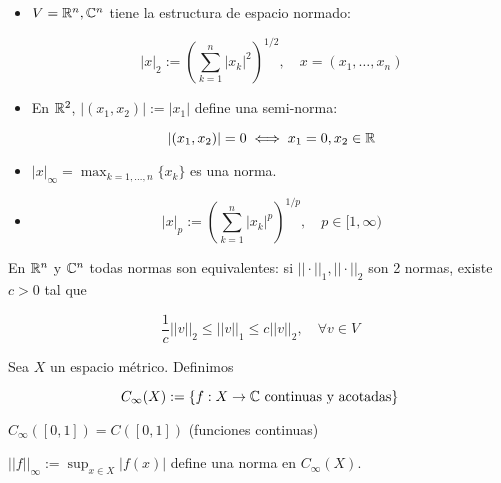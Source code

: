 \begin{fexample}
    \begin{itemize}
        \item $V=\mathbb{R}^n,\mathbb{C}^n$ tiene la estructura de espacio normado:

    \[|x|_2:=\left(\sum_{k=1}^n |x_k|^2\right)^{1/2},\quad x=(x_1,\ldots,x_n)\]

    \item En $\mathbb{R}^2$, $|(x_1,x_2)|:=|x_1|$ define una semi-norma:


    \[|(x_1,x_2)|=0\iff x_1=0,x_2\in\mathbb{R}\]

    \item $|x|_\infty=\displaystyle\max_{k=1,\ldots,n}\{x_k\}$ es una norma.

    \item \[|x|_p:=\left(\sum_{k=1}^n |x_k|^p\right)^{1/p},\quad p\in [1,\infty)\]
    \end{itemize}



\end{fexample}

\begin{fproposition}

En $\mathbb{R}^n$ y $\mathbb{C}^n$ todas normas son equivalentes: si $||\cdot||_1,||\cdot||_2$ son 2 normas, existe $c>0$ tal que

\[\frac{1}{c}||v||_2\leq ||v||_1\leq c||v||_2,\quad \forall v\in V\]

\end{fproposition}

\begin{fdefinition}
    Sea $X$ un espacio métrico. Definimos 

    \[C_\infty(X):=\{f:X\to\mathbb{C}\text{ continuas y acotadas}\}\]

\end{fdefinition}

\begin{fexample}
    $C_\infty([0,1]) = C([0,1])$ (funciones continuas)
\end{fexample}

\begin{fproposition}
    $||f||_\infty:=\displaystyle\sup_{x\in X}|f(x)|$ define una norma en $C_\infty(X)$.
\end{fproposition}

